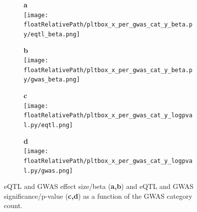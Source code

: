 %
%

\begin{figure}[!]
\centering
%
\begin{subfigure}[]{.33\textwidth}
\textbf{a}
\\
\texttt{[image: \\floatRelativePath/pltbox\_x\_per\_gwas\_cat\_y\_beta.py/eqtl\_beta.png]}
\end{subfigure}
%
\begin{subfigure}[]{.33\textwidth}
\textbf{b}
\\
\texttt{[image: \\floatRelativePath/pltbox\_x\_per\_gwas\_cat\_y\_beta.py/gwas\_beta.png]}
\end{subfigure}

\begin{subfigure}[]{.33\textwidth}
\textbf{c}
\\
\texttt{[image: \\floatRelativePath/pltbox\_x\_per\_gwas\_cat\_y\_logpval.py/eqtl.png]}
\end{subfigure}
%
\begin{subfigure}[]{.33\textwidth}
\textbf{d}
\\
\texttt{[image: \\floatRelativePath/pltbox\_x\_per\_gwas\_cat\_y\_logpval.py/gwas.png]}
\end{subfigure}

\caption{eQTL and GWAS effect size/beta (\textbf{a,b}) and eQTL and GWAS significance/p-value (\textbf{c,d}) as a function of the GWAS category count.} \label{fig:beta_pval}
%
\end{figure}

%
%

